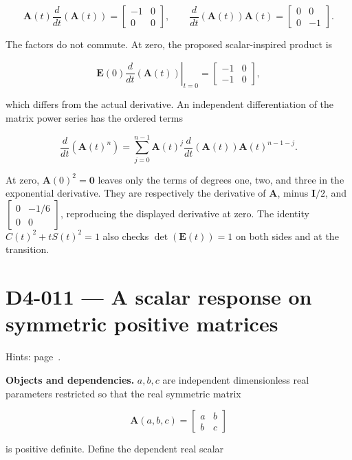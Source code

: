 \documentclass[11pt,oneside,openany]{book}
\begin{document}
\[
\mathbf A(t)\frac{d}{dt}\left(\mathbf A(t)\right)
=\begin{bmatrix}-1&0\\0&0\end{bmatrix},\qquad
\frac{d}{dt}\left(\mathbf A(t)\right)\mathbf A(t)
=\begin{bmatrix}0&0\\0&-1\end{bmatrix}.
\]

The factors do not commute. At zero, the proposed scalar-inspired product is

\[
\mathbf E(0)\left.\frac{d}{dt}\left(\mathbf A(t)\right)\right|_{t=0}
=\begin{bmatrix}-1&0\\-1&0\end{bmatrix},
\]

which differs from the actual derivative. An independent differentiation of the matrix power series has the ordered terms

\[
\frac{d}{dt}\left(\mathbf A(t)^n\right)
=\sum_{j=0}^{n-1}\mathbf A(t)^j
\frac{d}{dt}\left(\mathbf A(t)\right)\mathbf A(t)^{n-1-j}.
\]

At zero, \(\mathbf A(0)^2=\mathbf0\) leaves only the terms of degrees one, two, and three in the exponential derivative. They are respectively the derivative of \(\mathbf A\), minus \(\mathbf I/2\), and \(\begin{bmatrix}0&-1/6\\0&0\end{bmatrix}\), reproducing the displayed derivative at zero. The identity \(C(t)^2+tS(t)^2=1\) also checks \(\det(\mathbf E(t))=1\) on both sides and at the transition.
\clearpage
\section{D4-011 --- A scalar response on symmetric positive matrices}
\label{problem:D4-011}
{\small Hints: page~\pageref{hints:D4-011}.}\par\medskip

\textbf{Objects and dependencies.} \(a,b,c\) are independent dimensionless real parameters restricted so that the real symmetric matrix

\[
\mathbf A(a,b,c)=\begin{bmatrix}a&b\\b&c\end{bmatrix}
\]

is positive definite. Define the dependent real scalar
\end{document}
